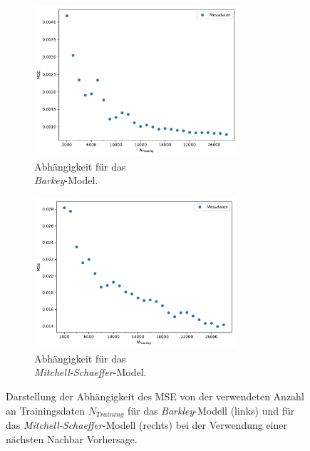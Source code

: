 \begin{figure}[h]
	\centering
	\begin{subfigure}{.5\textwidth}
		\centering
		\includegraphics[height=2.2in]{figures/results/cross_prediction/nn_trainlength_uv_mse.pdf}
		\setcapmargin[1cm]{1cm}
		\caption{Abhängigkeit für das \\ \textit{Barkey}-Model.}
		\label{fig:exp_cross_nn_trainlength_mse_uv}
	\end{subfigure}%
	\begin{subfigure}{.5\textwidth}
		\centering
		\includegraphics[height=2.2in]{figures/results/cross_prediction/nn_trainlength_vh_mse.pdf}
		\setcapmargin[1cm]{1cm}
		\caption{Abhängigkeit für das \\ \textit{Mitchell-Schaeffer}-Model.}
		\label{fig:exp_cross_nn_trainlength_mse_vh}
	\end{subfigure}
	\caption{Darstellung der Abhängigkeit des MSE von der verwendeten Anzahl an Trainingsdaten $N_{Training}$ für das \textit{Barkley}-Modell (links) und für das \textit{Mitchell-Schaeffer}-Modell (rechts) bei der Verwendung einer nächsten Nachbar Vorhersage.}
	\label{fig:exp_cross_nn_trainlength_mse}
\end{figure}

\FloatBarrier
